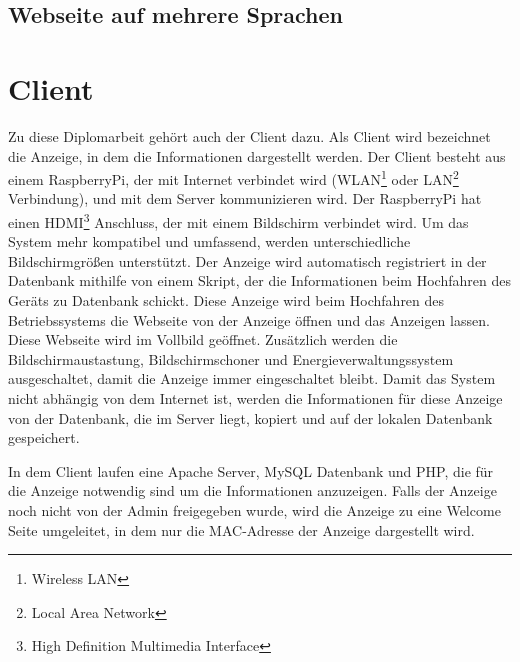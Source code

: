 \subsection{Webseite auf mehrere Sprachen}

\section{Client}

Zu diese Diplomarbeit geh\"{o}rt auch der Client dazu. Als Client wird bezeichnet die Anzeige, in dem die Informationen dargestellt werden. Der Client besteht aus einem RaspberryPi, der mit Internet verbindet wird (WLAN\footnote{Wireless LAN} oder LAN\footnote{Local Area Network} Verbindung), und mit dem Server kommunizieren wird. Der RaspberryPi hat einen HDMI\footnote{High Definition Multimedia Interface} Anschluss, der mit einem Bildschirm verbindet wird. Um das System mehr kompatibel und umfassend, werden unterschiedliche Bildschirmgr\"{o}\ss{}en unterst\"{u}tzt. Der Anzeige wird automatisch registriert in der Datenbank mithilfe von einem Skript, der die Informationen beim Hochfahren des Ger\"{a}ts zu Datenbank schickt. Diese Anzeige wird beim Hochfahren des Betriebssystems die Webseite von der Anzeige \"{o}ffnen und das Anzeigen lassen. Diese Webseite wird im Vollbild ge\"{o}ffnet. Zus\"{a}tzlich werden die Bildschirmaustastung, Bildschirmschoner und Energieverwaltungssystem ausgeschaltet, damit die Anzeige immer eingeschaltet bleibt. Damit das System nicht abh\"{a}ngig von dem Internet ist, werden die Informationen f\"{u}r diese Anzeige von der Datenbank, die im Server liegt, kopiert und auf der lokalen Datenbank gespeichert. 

In dem Client laufen eine Apache Server, MySQL Datenbank und PHP, die f\"{u}r die Anzeige notwendig sind um die Informationen anzuzeigen. Falls der Anzeige noch nicht von der Admin freigegeben wurde, wird die Anzeige zu eine Welcome Seite umgeleitet, in dem nur die MAC-Adresse der Anzeige dargestellt wird.





